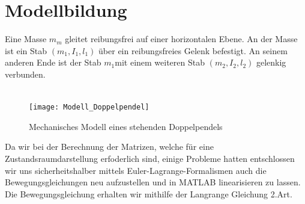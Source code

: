 \documentclass[a4paper, 10pt]{report}
\begin{document}
\chapter{Modellbildung}

Eine Masse $ m_{m} $ gleitet reibungsfrei auf einer horizontalen Ebene. An der Masse ist ein Stab $ (m_{1}, I_{1}, l_{1}) $ über ein reibungsfreies Gelenk befestigt. An seinem anderen Ende ist der Stab $m_{1} $mit einem weiteren Stab $ (m_{2}, I_{2}, l_{2}) $ gelenkig verbunden.
\\
\\
\begin{figure}[h]
\centering  %
{\texttt{[image: Modell\_Doppelpendel]}}
\caption{Mechanisches Modell eines stehenden Doppelpendels}
\end{figure}
\newpage
\noindent
Da wir bei der Berechnung der Matrizen, welche für eine Zustandsraumdarstellung erfoderlich sind, einige Probleme hatten entschlossen wir uns sicherheitshalber mittels Euler-Lagrange-Formalismen auch die Bewegungsgleichungen neu aufzustellen und in MATLAB linearisieren zu lassen. Die Bewegungsgleichung erhalten wir mithilfe der Langrange Gleichung 2.Art.
\end{document}
